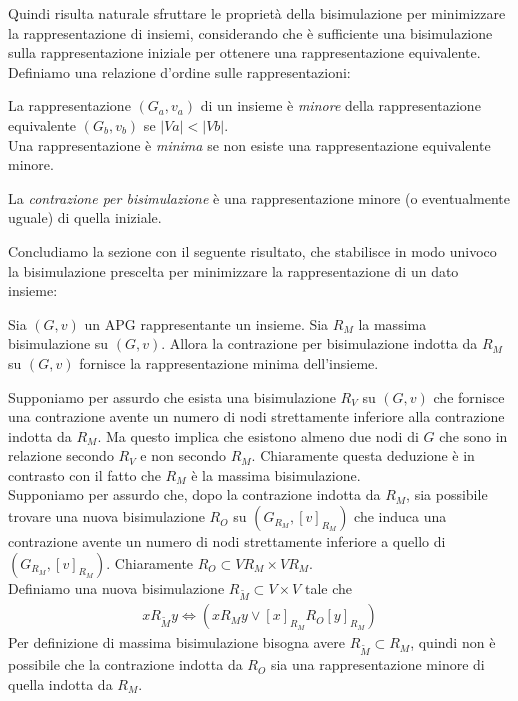 Quindi risulta naturale sfruttare le proprietà della bisimulazione per minimizzare la rappresentazione di insiemi, considerando che è sufficiente una bisimulazione sulla rappresentazione iniziale per ottenere una rappresentazione equivalente. Definiamo una relazione d'ordine sulle rappresentazioni:
\begin{definition}
    La rappresentazione $(G_a, v_a)$ di un insieme è \emph{minore} della rappresentazione equivalente $(G_b, v_b)$ se $|Va| < |Vb|$.\\
    Una rappresentazione è \emph{minima} se non esiste una rappresentazione equivalente minore.
\end{definition}
\begin{observation}
    La \emph{contrazione per bisimulazione} è una rappresentazione minore (o eventualmente uguale) di quella iniziale.
\end{observation}
Concludiamo la sezione con il seguente risultato, che stabilisce in modo univoco la bisimulazione prescelta per minimizzare la rappresentazione di un dato insieme:
\begin{theorem}
    Sia $(G,v)$ un APG rappresentante un insieme. Sia $R_M$ la massima bisimulazione su $(G,v)$. Allora la contrazione per bisimulazione indotta da $R_M$ su $(G,v)$ fornisce la rappresentazione minima dell'insieme.
\end{theorem}
\begin{proof2}
    Supponiamo per assurdo che esista una bisimulazione $R_V$ su $(G,v)$ che fornisce una contrazione avente un numero di nodi strettamente inferiore alla contrazione indotta da $R_M$. Ma questo implica che esistono almeno due nodi di $G$ che sono in relazione secondo $R_V$ e non secondo $R_M$. Chiaramente questa deduzione è in contrasto con il fatto che $R_M$ è la massima bisimulazione.\\
    Supponiamo per assurdo che, dopo la contrazione indotta da $R_M$, sia possibile trovare una nuova bisimulazione $R_O$ su $(G_{R_M}, [v]_{R_M})$ che induca una contrazione avente un numero di nodi strettamente inferiore a quello di $(G_{R_M}, [v]_{R_M})$. Chiaramente $R_O \subset V{R_M} \times V{R_M}$.\\
    Definiamo una nuova bisimulazione $R_{\widetilde{M}} \subset V\times V$ tale che
    \begin{gather*}
        x R_{\widetilde{M}} y \iff (x R_M y \lor [x]_{R_M} R_O [y]_{R_M})
    \end{gather*}
    Per definizione di massima bisimulazione bisogna avere $R_{\widetilde{M}} \subset R_M$, quindi non è possibile che la contrazione indotta da $R_O$ sia una rappresentazione minore di quella indotta da $R_M$.
\end{proof2}

